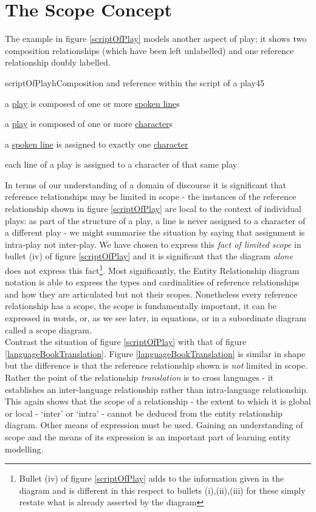 \section{The Scope Concept}
\noindent The example in figure \ref{scriptOfPlay} models another aspect of play; it shows two composition relationships (which have been left unlabelled) and one reference relationship doubly labelled. \\


\begin{erbulletedDimFig}{scriptOfPlay}{h}{Composition and reference within the script of a play}{4}{5}
\item{a \underline{play} is composed of one or more \underline{spoken line}s}
\item{a \underline{play} is composed of one or more \underline{character}s}
\item{a \underline{spoken line} is assigned to exactly one \underline{character}}
\item{each line of a play is assigned to a character of that same play}
\end{erbulletedDimFig} 


\noindent In terms of our understanding of a domain of discourse it is significant that reference relationships may be limited in scope - the instances of the reference relationship shown in figure \ref{scriptOfPlay} are local to the context of individual plays: as part of the structure of a play, a line is never assigned to a character of a different play - we might summarise the situation by saying that assignment is intra-play not inter-play. We have chosen to express this \emph{fact of limited scope} in bullet (iv) of figure \ref{scriptOfPlay} and it is significant that the diagram \emph{alone} does not express this fact\footnote{Bullet (iv) of figure {\ref{scriptOfPlay}} adds to the information given in the diagram and is different in this respect to bullets (i),(ii),(iii) for these simply restate what is already asserted by the diagram}.  Most significantly, the Entity Relationship diagram notation is able to express the types and cardinalities of reference relationships and how they are articulated but not their scopes. 
Nonetheless every reference relationship has a scope, the scope is fundamentally important,  it can be expressed in words, or, as we see later, in equations, or in a subordinate diagram called a scope diagram. \\

\noindent Contrast the situation of figure {\ref{scriptOfPlay}} with that of figure \ref{languageBookTranslation}. Figure \ref{languageBookTranslation} is similar in shape but the difference is that the reference relationship shown is \emph{not} limited in scope. Rather the point of the relationship \emph{translation} is to cross languages - it establishes an inter-language relationship rather than intra-language relationship. This again shows that the scope of a relationship - the extent to which it is global or local - `inter' or `intra' - cannot be deduced from the entity relationship diagram. Other means of expression must be used. Gaining an understanding of scope and the means of its expression is an important part of learning entity modelling. \\

